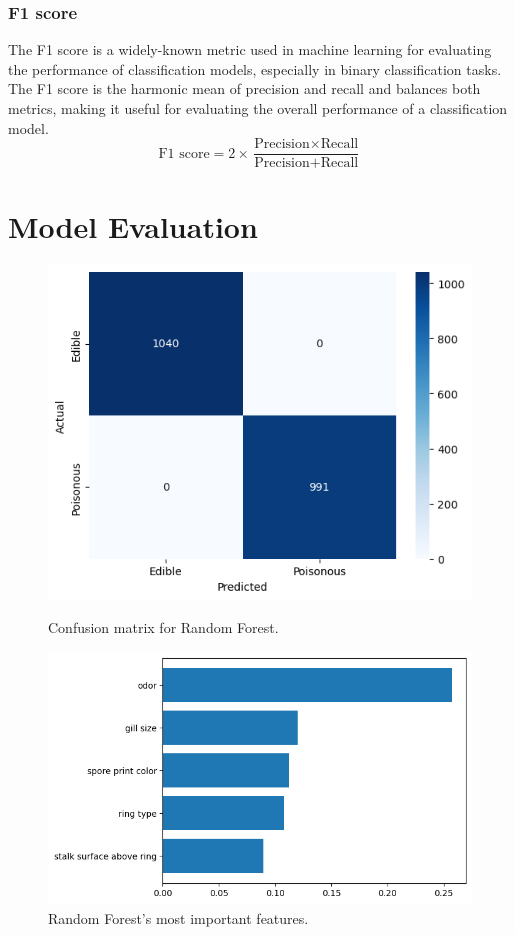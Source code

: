 \documentclass[11pt, conference]{IEEEtran}
\begin{document}
    \subsubsection{F1 score}
    The F1 score is a widely-known metric used in machine learning for evaluating the performance of classification models, especially in binary classification tasks. The F1 score is the harmonic mean of precision and recall and balances both metrics, making it useful for evaluating the overall performance of a classification model.
    \begin{equation}
        \text{F1 score} = 2 \times \frac{\text{Precision} \times \text{Recall}}{\text{Precision} + \text{Recall}}\label{eq4}
    \end{equation}

\section{Model Evaluation}
    \begin{figure}[htbp]
        \centering
        \begin{minipage}{0.5\textwidth}
            \centering
            \includegraphics[width=0.75\linewidth]{plot/matrix/randomforest.png}
            \caption{Confusion matrix for Random Forest.}
            \label{fig:plot5}
        \end{minipage}%
        \begin{minipage}{0.5\textwidth}
            \centering
            \includegraphics[width=1\linewidth]{plot/count/rf_importance.png}
            \caption{Random Forest's most important features.}
            \label{fig:plot6}
        \end{minipage}
    \end{figure}
    
\end{document}
